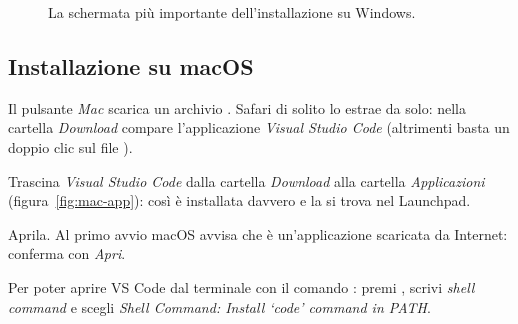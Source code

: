 \begin{figure}[H]
  \caption{La schermata più importante dell'installazione su Windows.}
  \label{fig:installer}
\end{figure}

\subsection{Installazione su macOS}

Il pulsante \textit{Mac} scarica un archivio . Safari di solito lo
estrae da solo: nella cartella \textit{Download} compare l'applicazione
\textit{Visual Studio Code} (altrimenti basta un doppio clic sul file
).

\begin{passi}
  \item Trascina \textit{Visual Studio Code} dalla cartella \textit{Download}
        alla cartella \textit{Applicazioni} (figura~\ref{fig:mac-app}): così
        è installata davvero e la si trova nel Launchpad.
  \item Aprila. Al primo avvio macOS avvisa che è un'applicazione scaricata
        da Internet: conferma con \textit{Apri}.
  \item Per poter aprire VS Code dal terminale con il comando :
        premi , scrivi \textit{shell command} e scegli
        \textit{Shell Command: Install `code' command in PATH}.
\end{passi}

